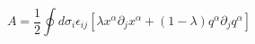 \begin{equation}
\label{arealambda}
A=\frac{1}{2}\oint d\sigma_i\epsilon_{ij}[\lambda x^{\alpha}\partial_jx^{\alpha}+(1-\lambda )q^{\alpha}\partial_jq^{\alpha}]
\end{equation}

